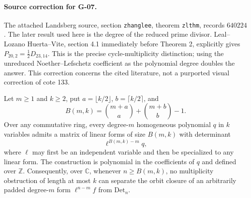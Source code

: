 \paragraph{Source correction for G-07.}
The attached Landsberg source, section \texttt{zhanglee}, theorem \texttt{zlthm}, records $640224$. The later result used here is the degree of the reduced prime divisor. Leal--Lozano Huerta--Vite, section 4.1 immediately before Theorem 2, explicitly gives $P_{20,2}=\tfrac12D_{23,14}$. This is the precise cycle-multiplicity distinction; using the unreduced Noether--Lefschetz coefficient as the polynomial degree doubles the answer. This correction concerns the cited literature, not a purported visual correction of cote 133.

\begin{proposition}\label{G-08}
Let $m\geq1$ and $k\geq2$, put $a=\lfloor k/2\rfloor$, $b=\lceil k/2\rceil$, and
\[
 B(m,k)=\binom{m+a}{a}+\binom{m+b}{b}-1.
\]
Over any commutative ring, every degree-$m$ homogeneous polynomial $q$ in $k$ variables admits a matrix of linear forms of size $B(m,k)$ with determinant
\[
 \ell^{B(m,k)-m}q,
\]
where $\ell$ may first be an independent variable and then be specialized to any linear form. The construction is polynomial in the coefficients of $q$ and defined over $\mathbb Z$.
Consequently, over $\mathbb C$, whenever $n\geq B(m,k)$, no multiplicity obstruction of length at most $k$ can separate the orbit closure of an arbitrarily padded degree-$m$ form $\ell^{n-m}f$ from $\mathrm{Det}_n$.
\end{proposition}

